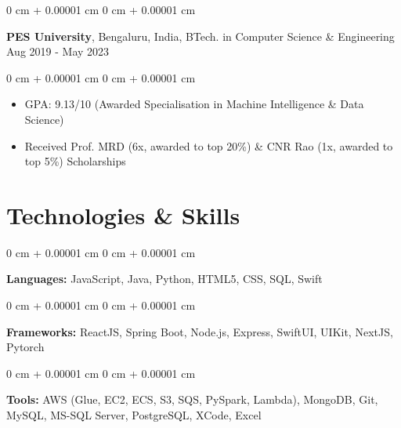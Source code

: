 \documentclass[10pt, a4paper]{article}
\newenvironment{highlights}{
    \begin{itemize}[
        topsep=0.10 cm,
        parsep=0.10 cm,
        partopsep=0pt,
        itemsep=0pt,
        leftmargin=0 cm + 10pt
    ]
}{
    \end{itemize}
} %
\newenvironment{onecolentry}{
    \begin{adjustwidth}{
        0 cm + 0.00001 cm
    }{
        0 cm + 0.00001 cm
    }
}{
    \end{adjustwidth}
} %
\newenvironment{twocolentry}[2][]{
    \onecolentry
    \def\secondColumn{#2}
    \setcolumnwidth{\fill, 6.0 cm}
    \begin{paracol}{2}
}{
    \switchcolumn \raggedleft \secondColumn
    \end{paracol}
    \endonecolentry
} %
\begin{document}
        \vspace{0.15 cm}
        \begin{twocolentry}{
            Aug 2019 - May 2023
        }
            \textbf{PES University}, Bengaluru, India, BTech. in Computer Science \& Engineering\end{twocolentry}

        \vspace{0.10 cm}
        \begin{onecolentry}
            \begin{highlights}
                \item GPA: 9.13/10 (Awarded Specialisation in Machine Intelligence \& Data Science)
                \item Received Prof. MRD (6x, awarded to top 20\%) \& CNR Rao (1x, awarded to top 5\%) Scholarships
            \end{highlights}
        \end{onecolentry}

    \section{Technologies \& Skills}
        \begin{onecolentry}
            \textbf{Languages:} JavaScript, Java, Python, HTML5, CSS, SQL, Swift 
        \end{onecolentry}
        \begin{onecolentry}
            \textbf{Frameworks:} ReactJS, Spring Boot, Node.js, Express, SwiftUI, UIKit, NextJS, Pytorch
        \end{onecolentry}
        \begin{onecolentry}
            \textbf{Tools:} AWS (Glue, EC2, ECS, S3, SQS, PySpark, Lambda), MongoDB, Git, MySQL, MS-SQL Server, PostgreSQL, XCode, Excel
        \end{onecolentry}
\end{document}
